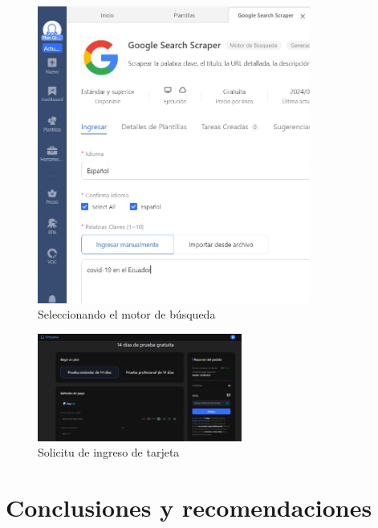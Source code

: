 \documentclass[12pt]{article}
\begin{document}
                        \begin{figure}[!h]
                                \centering
                                \includegraphics[width=0.8\textwidth]{img/octoparse-3.png}
                                \caption{Seleccionando el motor de búsqueda}
                        \end{figure}
                        \begin{figure}[!h]
                                \centering
                                \includegraphics[width=0.6\textwidth]{img/octoparse-4.png}
                                \caption{Solicitu de ingreso de tarjeta}
                        \end{figure}


        \newpage
        \section{Conclusiones y recomendaciones}
\end{document}
